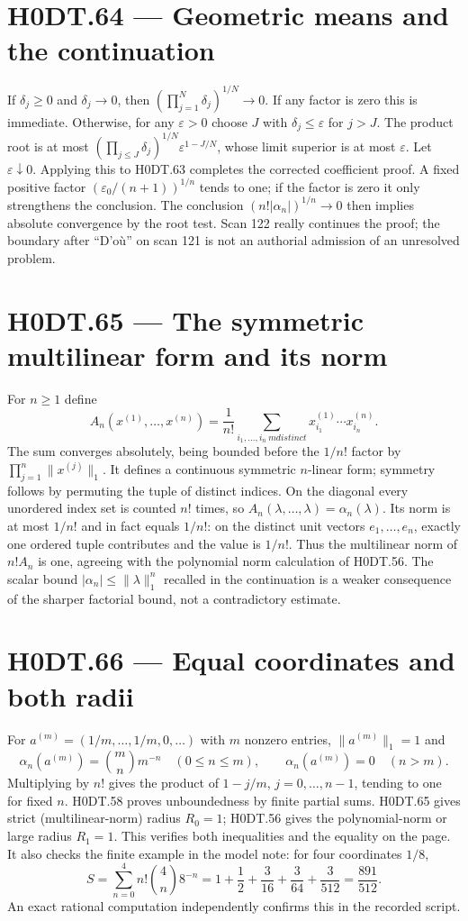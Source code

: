 \section*{H0DT.64 --- Geometric means and the continuation}
If $\delta_j\ge0$ and $\delta_j\to0$, then $(\prod_{j=1}^N\delta_j)^{1/N}\to0$. If any factor is zero this is immediate. Otherwise, for any $\varepsilon>0$ choose $J$ with $\delta_j\le\varepsilon$ for $j>J$. The product root is at most $(\prod_{j\le J}\delta_j)^{1/N}\varepsilon^{1-J/N}$, whose limit superior is at most $\varepsilon$. Let $\varepsilon\downarrow0$. Applying this to H0DT.63 completes the corrected coefficient proof. A fixed positive factor $(\varepsilon_0/(n+1))^{1/n}$ tends to one; if the factor is zero it only strengthens the conclusion. The conclusion $(n!|\alpha_n|)^{1/n}\to0$ then implies absolute convergence by the root test. Scan 122 really continues the proof; the boundary after ``D'o\`u'' on scan 121 is not an authorial admission of an unresolved problem.

\section*{H0DT.65 --- The symmetric multilinear form and its norm}
For $n\ge1$ define
\[
 A_n(x^{(1)},\ldots,x^{(n)})=\frac1{n!}
 \sum_{i_1,\ldots,i_n\ {
m distinct}}
 x^{(1)}_{i_1}\cdots x^{(n)}_{i_n}.
\]
The sum converges absolutely, being bounded before the $1/n!$ factor by $\prod_{j=1}^n\|x^{(j)}\|_1$. It defines a continuous symmetric $n$-linear form; symmetry follows by permuting the tuple of distinct indices. On the diagonal every unordered index set is counted $n!$ times, so $A_n(\lambda,\ldots,\lambda)=\alpha_n(\lambda)$. Its norm is at most $1/n!$ and in fact equals $1/n!$: on the distinct unit vectors $e_1,\ldots,e_n$, exactly one ordered tuple contributes and the value is $1/n!$. Thus the multilinear norm of $n!A_n$ is one, agreeing with the polynomial norm calculation of H0DT.56. The scalar bound $|\alpha_n|\le\|\lambda\|_1^n$ recalled in the continuation is a weaker consequence of the sharper factorial bound, not a contradictory estimate.

\section*{H0DT.66 --- Equal coordinates and both radii}
For $a^{(m)}=(1/m,\ldots,1/m,0,\ldots)$ with $m$ nonzero entries, $\|a^{(m)}\|_1=1$ and
\[
 \alpha_n(a^{(m)})=\binom mn m^{-n}\quad(0\le n\le m),\qquad
 \alpha_n(a^{(m)})=0\quad(n>m).
\]
Multiplying by $n!$ gives the product of $1-j/m$, $j=0,\ldots,n-1$, tending to one for fixed $n$. H0DT.58 proves unboundedness by finite partial sums. H0DT.65 gives strict (multilinear-norm) radius $R_0=1$; H0DT.56 gives the polynomial-norm or large radius $R_1=1$. This verifies both inequalities and the equality on the page. It also checks the finite example in the model note: for four coordinates $1/8$,
\[
 S=\sum_{n=0}^4n!\binom4n8^{-n}
 =1+\frac12+\frac3{16}+\frac3{64}+\frac3{512}
 =\frac{891}{512}.
\]
An exact rational computation independently confirms this in the recorded script.

